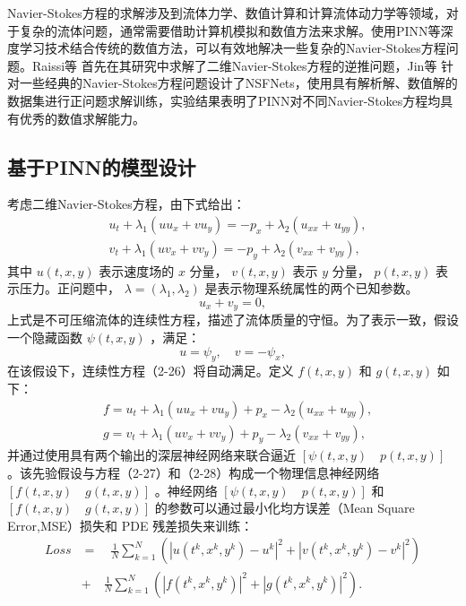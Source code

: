 Navier-Stokes方程的求解涉及到流体力学、数值计算和计算流体动力学等领域，对于复杂的流体问题，通常需要借助计算机模拟和数值方法来求解。使用PINN等深度学习技术结合传统的数值方法，可以有效地解决一些复杂的Navier-Stokes方程问题。Raissi等 \cite{raissi2019physics}首先在其研究中求解了二维Navier-Stokes方程的逆推问题，Jin等 \cite{jin2021nsfnets}针对一些经典的Navier-Stokes方程问题设计了NSFNets，使用具有解析解、数值解的数据集进行正问题求解训练，实验结果表明了PINN对不同Navier-Stokes方程均具有优秀的数值求解能力。

\subsection{基于PINN的模型设计}

考虑二维Navier-Stokes方程，由下式给出：
\begin{equation}
    \begin{aligned}
        & u_t+\lambda_1(uu_x+vu_y)=-p_x+\lambda_2(u_{xx}+u_{yy}),\\
        & v_t+\lambda_1(uv_x+vv_y)=-p_y+\lambda_2(v_{xx}+v_{yy}),
    \end{aligned}
\end{equation}
其中 $u(t,x,y)$ 表示速度场的 $x$ 分量， $v(t,x,y)$ 表示 $y$ 分量， $p(t,x,y)$ 表示压力。正问题中， $\lambda=(\lambda_1,\lambda_2)$ 是表示物理系统属性的两个已知参数。
\begin{equation}u_x+v_y=0,\end{equation}
上式是不可压缩流体的连续性方程，描述了流体质量的守恒。为了表示一致，假设一个隐藏函数 $\psi(t,x,y)$ ，满足：
\begin{equation}u=\psi_y,\quad v=-\psi_x,\end{equation}
在该假设下，连续性方程（2-26）将自动满足。定义 $f(t,x,y)$ 和 $g(t,x,y)$ 如下：
\begin{equation}
    \begin{aligned}
        & f=u_t+\lambda_1(uu_x+vu_y)+p_x-\lambda_2(u_{xx}+u_{yy}),\\
        & g=v_t+\lambda_1(uv_x+vv_y)+p_y-\lambda_2(v_{xx}+v_{yy}),
    \end{aligned}
\end{equation}
并通过使用具有两个输出的深层神经网络来联合逼近 $[\psi(t, x, y) \quad p(t, x, y)]$ 。该先验假设与方程（2-27）和（2-28）构成一个物理信息神经网络 $[f(t, x, y) \quad g(t, x, y)]$ 。神经网络 $[\psi(t, x, y) \quad p(t, x, y)]$ 和 $[f(t, x, y) \quad g(t, x, y)]$ 的参数可以通过最小化均方误差（Mean Square Error,MSE）损失和 PDE 残差损失来训练：
\begin{equation}
    \begin{aligned}
        Loss&=\quad\frac1N\sum_{k=1}^N\left(|u(t^k,x^k,y^k)-u^k|^2+|v(t^k,x^k,y^k)-v^k|^2\right)\\
            &+\quad\frac1N\sum_{k=1}^N\left(|f(t^k,x^k,y^k)|^2+|g(t^k,x^k,y^k)|^2\right).
    \end{aligned}
    \label{equ:ns_loss}
\end{equation}

